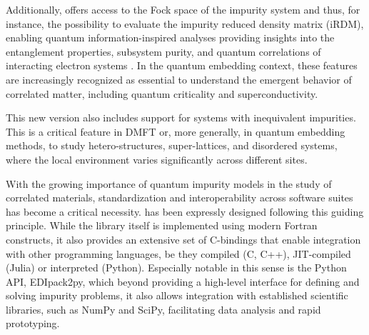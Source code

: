 \documentclass[edipack_sp.tex]{subfiles}
\begin{document}
Additionally, \NAME offers access to the Fock space of
the impurity system and thus, for instance, the possibility to evaluate the impurity reduced density matrix (iRDM), enabling quantum information-inspired analyses providing insights into the entanglement properties, subsystem purity, and quantum correlations of interacting electron systems \cite{Walsh2021PNAS,Bellomia2024PRB}.
In the quantum embedding context, these features are increasingly recognized as essential to understand the emergent behavior of correlated matter, including quantum criticality and superconductivity.

This new \NAME version also includes support for systems with inequivalent impurities. This is a critical feature in DMFT or, more generally, in quantum embedding methods, to study hetero-structures, super-lattices, and disordered systems, where the local environment varies significantly across different sites.

With the growing importance of quantum impurity models in the study of correlated materials, standardization and interoperability across software suites has
become a critical necessity.
\NAME has been expressly designed following this guiding principle. 
While the library itself is implemented using modern Fortran constructs, it also provides an extensive set of C-bindings that enable integration with other programming languages,
be they compiled (C, C++), JIT-compiled (Julia) or interpreted (Python).  
Especially notable in this sense is the Python API, EDIpack2py, which beyond providing a 
high-level interface for defining and solving impurity problems, it also allows integration with established scientific libraries, such as NumPy and SciPy, facilitating data analysis and
rapid prototyping. 
\end{document}
